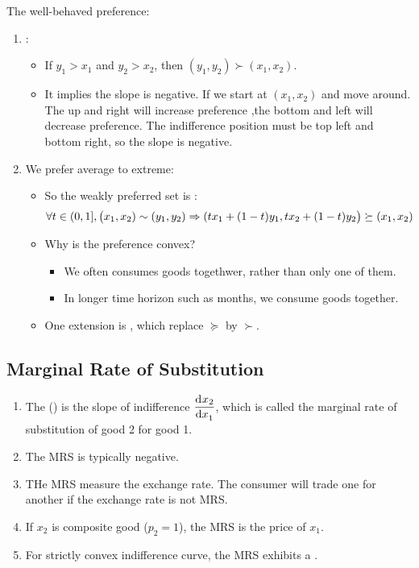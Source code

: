 The well-behaved preference:
\begin{enumerate}
    \item {}: 
        \begin{itemize}
            \item If $y_1 > x_1$ and $y_2 > x_2$, then $(y_1,y_2) \succ (x_1, x_2)$.
            \item It implies the slope is negative. If we start at $(x_1, x_2)$ and move around. The up and right will increase preference ,the bottom and left will decrease preference. The indifference position must be top left and bottom right, so the slope is negative.
        \end{itemize}
    \item We prefer average to extreme:
        \begin{itemize}
            \item So the weakly preferred set is :
                \begin{equation}
                    \forall t \in (0,1], \mleft(x_1,x_2) \sim (y_1,y_2) \Rightarrow (t x_1 + (1-t)y_1, t x_2 + (1-t)y_2 \mright) \succeq (x_1,x_2)
                \end{equation}
            \item Why is the preference convex?
                \begin{itemize}
                    \item We often consumes goods togethwer, rather than only one of them.
                    \item In longer time horizon such as months, we consume goods together.
                \end{itemize}
            \item One extension is , which replace $\succeq$ by $\succ$.
        \end{itemize}
\end{enumerate}




\subsection{Marginal Rate of Substitution}

\begin{enumerate}
    \item The  () is the slope of indifference $\dod{x_2}{x_1}$, which is called the marginal rate of substitution of good 2 for good 1. 
    \item The MRS is typically negative.
    \item THe MRS measure the exchange rate. The consumer will trade one for another if the exchange rate is not MRS.
    \item If $x_2$ is composite good ($p_2 = 1$), the MRS is the price of $x_1$.
    \item For strictly convex indifference curve, the MRS exhibits a .
\end{enumerate}




